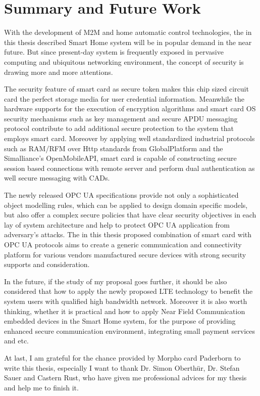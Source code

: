 \chapter{Summary and Future Work}\label{secSummary}

With the development of M2M and home automatic control technologies, the in this thesis described Smart Home system will be in popular demand in the near future. But since present-day system is frequently exposed in pervasive computing and ubiquitous networking environment, the concept of security is drawing more and more attentions. 

The security feature of smart card as secure token makes this chip sized circuit card the perfect storage media for user credential information. Meanwhile the hardware supports for the execution of encryption algorithms and smart card OS security mechanisms such as key management and secure APDU messaging protocol contribute to add additional secure protection to the system that employs smart card. Moreover by applying well standardized industrial protocols such as RAM/RFM over Http standards from GlobalPlatform and the Simalliance’s OpenMobileAPI, smart card is capable of constructing secure session based connections with remote server and perform dual authentication as well secure messaging with CADs.

The newly released OPC UA specifications provide not only a sophisticated object modelling rules, which can be applied to design domain specific models, but also offer a complex secure policies that have clear security objectives in each lay of system architecture and help to protect OPC UA application from adversary's attacks. 
The in this thesis proposed combination of smart card with OPC UA protocols aims to create a generic communication and connectivity platform for  various vendors manufactured secure devices with strong security supports and consideration. 

In the future, if the study of my proposal goes further, it should be also considered that how to apply the newly proposed LTE technology to benefit the system users with qualified high bandwidth network. Moreover it is also worth thinking, whether it is practical and how to apply Near Field Communication embedded devices in the Smart Home system, for the purpose of providing enhanced secure communication environment, integrating small payment services and etc.

At last, I am grateful for the chance provided by Morpho card Paderborn to write this thesis, especially I want to thank Dr. Simon Oberth\"ur, Dr. Stefan Sauer and Castern Rust, who have given me professional advices for my thesis and help me to finish it.

 
